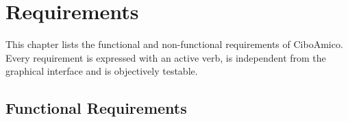 \chapter{Requirements}\label{ch:requirements}

This chapter lists the functional and non-functional requirements of
CiboAmico. Every requirement is expressed with an active verb, is independent
from the graphical interface and is objectively testable.

\section{Functional Requirements}

